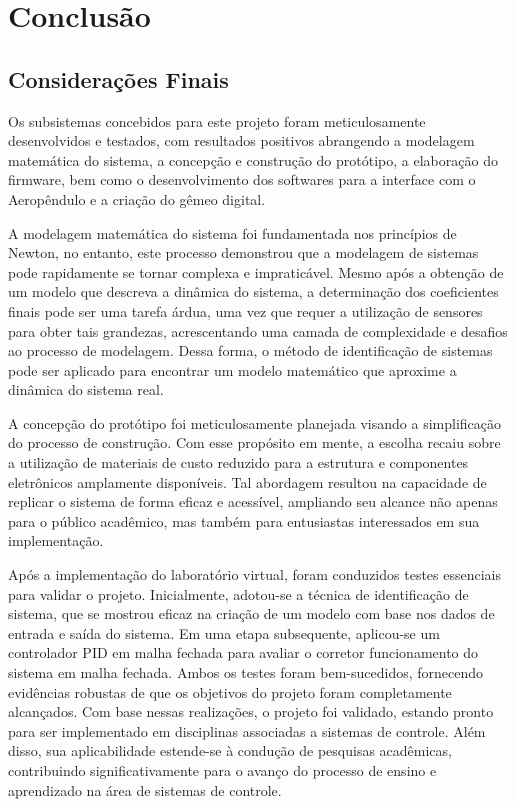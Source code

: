 \chapter{Conclusão}
\label{cap_conclusao}

\section{Considerações Finais}
\label{concideracoes_finais}

Os subsistemas concebidos para este projeto foram meticulosamente desenvolvidos e testados, com resultados positivos abrangendo a modelagem matemática do sistema, a concepção e construção do protótipo, a elaboração do firmware, bem como o desenvolvimento dos softwares para a interface com o Aeropêndulo e a criação do gêmeo digital.

A modelagem matemática do sistema foi fundamentada nos princípios de Newton, no entanto, este processo demonstrou que a modelagem de sistemas pode rapidamente se tornar complexa e impraticável. Mesmo após a obtenção de um modelo que descreva a dinâmica do sistema, a determinação dos coeficientes finais pode ser uma tarefa árdua, uma vez que requer a utilização de sensores para obter tais grandezas, acrescentando uma camada de complexidade e desafios ao processo de modelagem. Dessa forma, o método de identificação de sistemas pode ser aplicado para encontrar um modelo matemático que aproxime a dinâmica do sistema real.


A concepção do protótipo foi meticulosamente planejada visando a simplificação do processo de construção. Com esse propósito em mente, a escolha recaiu sobre a utilização de materiais de custo reduzido para a estrutura e componentes eletrônicos amplamente disponíveis. Tal abordagem resultou na capacidade de replicar o sistema de forma eficaz e acessível, ampliando seu alcance não apenas para o público acadêmico, mas também para entusiastas interessados em sua implementação.


Após a implementação do laboratório virtual, foram conduzidos testes essenciais para validar o projeto. Inicialmente, adotou-se a técnica de identificação de sistema, que se mostrou eficaz na criação de um modelo com base nos dados de entrada e saída do sistema. Em uma etapa subsequente, aplicou-se um controlador PID em malha fechada para avaliar o corretor funcionamento do sistema em malha fechada. Ambos os testes foram bem-sucedidos, fornecendo evidências robustas de que os objetivos do projeto foram completamente alcançados. Com base nessas realizações, o projeto foi validado, estando pronto para ser implementado em disciplinas associadas a sistemas de controle. Além disso, sua aplicabilidade estende-se à condução de pesquisas acadêmicas, contribuindo significativamente para o avanço do processo de ensino e aprendizado na área de sistemas de controle.

